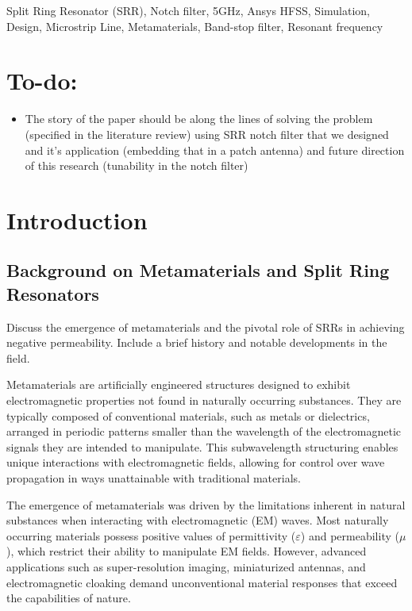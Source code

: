 \documentclass[conference]{IEEEtran}
\begin{document}
\begin{IEEEkeywords}
Split Ring Resonator (SRR), Notch filter, 5GHz, Ansys HFSS, Simulation, Design, Microstrip Line, Metamaterials, Band-stop filter, Resonant frequency
\end{IEEEkeywords}

\section{To-do:}
\begin{itemize}
    \item The story of the paper should be along the lines of solving the problem (specified in the literature review) using SRR notch filter that we designed and it's application (embedding that in a patch antenna) and future direction of this research (tunability in the notch filter)
\end{itemize}

\section{Introduction}

\subsection{Background on Metamaterials and Split Ring Resonators}

Discuss the emergence of metamaterials and the pivotal role of SRRs in achieving negative permeability. Include a brief history and notable developments in the field.



Metamaterials are artificially engineered structures designed to exhibit electromagnetic properties not found in naturally occurring substances. They are typically composed of conventional materials, such as metals or dielectrics, arranged in periodic patterns smaller than the wavelength of the electromagnetic signals they are intended to manipulate. This subwavelength structuring enables unique interactions with electromagnetic fields, allowing for control over wave propagation in ways unattainable with traditional materials.

The emergence of metamaterials was driven by the limitations inherent in natural substances when interacting with electromagnetic (EM) waves. Most naturally occurring materials possess positive values of permittivity ($\varepsilon$) and permeability ($\mu$), which restrict their ability to manipulate EM fields. However, advanced applications such as super-resolution imaging, miniaturized antennas, and electromagnetic cloaking demand unconventional material responses that exceed the capabilities of nature.
\end{document}

